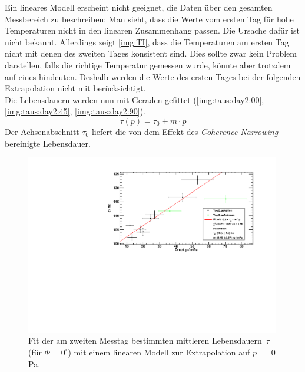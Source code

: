 Ein lineares Modell erscheint nicht geeignet,
die Daten über den gesamten Messbereich zu beschreiben:
Man sieht, dass die Werte vom ersten Tag für hohe Temperaturen nicht in den linearen Zusammenhang passen.
Die Ursache dafür ist nicht bekannt.
Allerdings zeigt \autoref{img:TI}, dass 
die Temperaturen am ersten Tag nicht mit denen des zweiten Tages konsistent sind.
Dies sollte zwar kein 
Problem darstellen, falls die richtige Temperatur gemessen wurde, könnte aber trotzdem auf eines hindeuten.
Deshalb werden die Werte des 
ersten Tages bei der folgenden Extrapolation nicht mit berücksichtigt. \\
Die Lebensdauern werden nun mit Geraden gefittet (\autoref{img:taus:day2:00}, \autoref{img:taus:day2:45}, \autoref{img:taus:day2:90}).
\begin{equation}
  \tau(p) = \tau_0 + m \cdot p
\end{equation}
Der Achsenabschnitt $\tau_0$ liefert die von dem Effekt des \emph{Coherence Narrowing} bereinigte Lebensdauer.

\begin{figure}[H]
\begin{center}
  \includegraphics[width=0.99\textwidth]{../img/taus_00_day2.pdf}
  \caption{Fit der am zweiten Messtag bestimmten mittleren Lebensdauern~$\tau$ (für $\Phi=0^\circ$) mit einem linearen Modell
  zur Extrapolation auf \mbox{$p$ = 0\,Pa}.}
  \label{img:taus:day2:00}
\end{center}
\end{figure}

